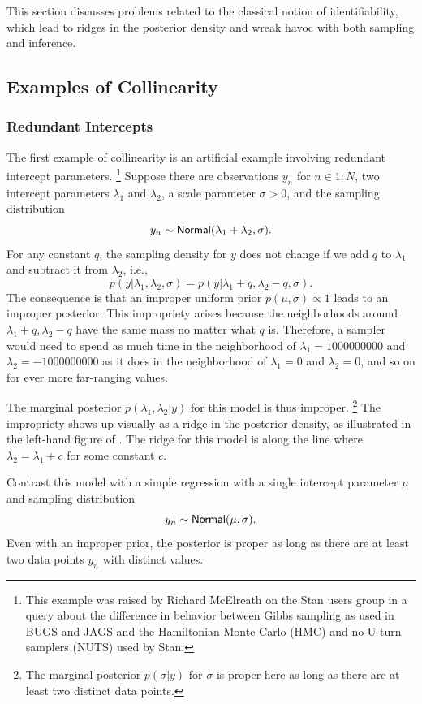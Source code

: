 This section discusses problems related to the classical notion of
identifiability, which lead to ridges in the posterior density and
wreak havoc with both sampling and inference.

\subsection{Examples of Collinearity}

\subsubsection{Redundant Intercepts}

The first example of collinearity is an artificial example involving
redundant intercept parameters.%
%
\footnote{This example was raised by Richard McElreath on the Stan
  users group in a query about the difference in behavior between
  Gibbs sampling as used in BUGS and JAGS and the Hamiltonian Monte
  Carlo (HMC) and no-U-turn samplers (NUTS) used by Stan.}
%
Suppose there are observations $y_n$ for $n \in 1{:}N$,
two intercept parameters $\lambda_1$ and
$\lambda_2$, a scale parameter $\sigma > 0$, and the sampling distribution
%
\[
y_n \sim \mbox{\sf Normal}(\lambda_1 + \lambda_2, \sigma).
\]
%
For any constant $q$, the sampling density for $y$ does not change if
we add $q$ to $\lambda_1$ and subtract it from $\lambda_2$, i.e.,
%
\[
p(y | \lambda_1, \lambda_2,\sigma)
=
p(y | \lambda_1 + q, \lambda_2 - q, \sigma).
\]
%
The consequence is that an improper uniform prior $p(\mu,\sigma)
\propto 1$ leads to an improper posterior.  This impropriety arises
because the neighborhoods around $\lambda_1 + q, \lambda_2 - q$ have
the same mass no matter what $q$ is.  Therefore, a sampler would need
to spend as much time in the neighborhood of $\lambda_1=1000000000$
and $\lambda_2=-1000000000$ as it does in the neighborhood of
$\lambda_1=0$ and $\lambda_2=0$, and so on for ever more far-ranging
values.

The marginal posterior $p(\lambda_1,\lambda_2|y)$ for this model is
thus improper.%
%
\footnote{The marginal posterior $p(\sigma|y)$ for $\sigma$ is proper
  here as long as there are at least two distinct data points.}
%
The impropriety shows up visually as a ridge in the posterior density,
as illustrated in the left-hand figure of
.  The ridge for this model is
along the line where $\lambda_2 = \lambda_1 + c$ for some constant
$c$.

Contrast this model with a simple regression with a single intercept
parameter $\mu$ and sampling distribution
\[
y_n \sim \mbox{\sf Normal}(\mu,\sigma).
\]
Even with an improper prior, the posterior is proper as long as there
are at least two data points $y_n$ with distinct values.


